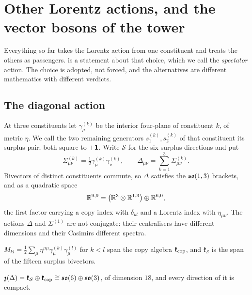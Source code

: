 \section{Other Lorentz actions, and the vector bosons of the tower}
\label{sec:actions}

Everything so far takes the Lorentz action from one constituent and treats the others as passengers.  is a
statement about that choice, which we call the \emph{spectator} action. The choice is adopted, not forced, and the alternatives are
different mathematics with different verdicts.

\subsection{The diagonal action}
\label{sec:diagonal}

At three constituents let $\gamma^{(k)}_\mu$ be the interior four-plane of constituent $k$, of metric $\eta$. We call the two
remaining generators $s^{(k)}_1,s^{(k)}_2$ of that constituent its surplus pair; both square to $+\mathbf 1$. Write $\mathcal S$ for the six surplus
directions and put
\[
\Sigma^{(k)}_{\mu\nu}=\tfrac12\gamma^{(k)}_\mu\gamma^{(k)}_\nu,\qquad \Delta_{\mu\nu}=\sum_{k=1}^3\Sigma^{(k)}_{\mu\nu}.
\]
Bivectors of distinct constituents commute, so $\Delta$ satisfies the $\mathfrak{so}(1,3)$ brackets, and as a quadratic space
\begin{equation}
\label{eq:tensorpic}
\mathbb{R}^{9,9}=\bigl(\mathbb{R}^3\otimes\mathbb{R}^{1,3}\bigr)\oplus\mathbb{R}^{6,0},
\end{equation}
the first factor carrying a copy index with $\delta_{kl}$ and a Lorentz index with $\eta_{\mu\nu}$. The actions $\Delta$ and $\Sigma^{(1)}$ are
not conjugate: their centralisers have different dimensions and their Casimirs different spectra.

\begin{definition}
$M_{kl}=\tfrac12\sum_\mu\eta^{\mu\mu}\gamma^{(k)}_\mu\gamma^{(l)}_\mu$ for $k<l$ span the copy algebra $\mathfrak k_{\rm cop}$, and
$\mathfrak k_{\mathcal S}$ is the span of the fifteen surplus bivectors.
\end{definition}

\begin{theorem}
\label{thm:diagcent}
$\mathfrak z(\Delta)=\mathfrak k_{\mathcal S}\oplus\mathfrak k_{\rm cop}\cong\mathfrak{so}(6)\oplus\mathfrak{so}(3)$, of dimension $18$, and every direction of it is compact.
\end{theorem}

